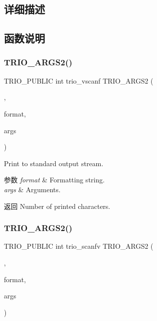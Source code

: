 \subsection{详细描述}


\subsection{函数说明}
\mbox{\label{group___printf_ga1b4cbeca40314883d90a26034076651b}} 
\subsubsection{\texorpdfstring{T\+R\+I\+O\+\_\+\+A\+R\+G\+S2()}{TRIO\_ARGS2()}\hspace{0.1cm}{\footnotesize\ttfamily [1/2]}}
{\footnotesize\ttfamily T\+R\+I\+O\+\_\+\+P\+U\+B\+L\+IC int trio\+\_\+vscanf T\+R\+I\+O\+\_\+\+A\+R\+G\+S2 (\begin{DoxyParamCaption}\item[{(format, \hyperlink{structargs}{args})}]{,  }\item[{T\+R\+I\+O\+\_\+\+C\+O\+N\+ST char $\ast$}]{format,  }\item[{va\+\_\+list}]{args }\end{DoxyParamCaption})}

Print to standard output stream.


\begin{DoxyParams}{参数}
{\em format} & Formatting string. \\
\hline
{\em args} & Arguments. \\
\hline
\end{DoxyParams}
\begin{DoxyReturn}{返回}
Number of printed characters. 
\end{DoxyReturn}
\mbox{\label{group___printf_gafdccde42df6e234ff1fd0b065494addc}} 
\subsubsection{\texorpdfstring{T\+R\+I\+O\+\_\+\+A\+R\+G\+S2()}{TRIO\_ARGS2()}\hspace{0.1cm}{\footnotesize\ttfamily [2/2]}}
{\footnotesize\ttfamily T\+R\+I\+O\+\_\+\+P\+U\+B\+L\+IC int trio\+\_\+scanfv T\+R\+I\+O\+\_\+\+A\+R\+G\+S2 (\begin{DoxyParamCaption}\item[{(format, \hyperlink{structargs}{args})}]{,  }\item[{T\+R\+I\+O\+\_\+\+C\+O\+N\+ST char $\ast$}]{format,  }\item[{trio\+\_\+pointer\+\_\+t $\ast$}]{args }\end{DoxyParamCaption})}

